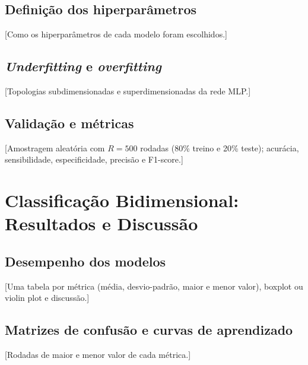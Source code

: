 \documentclass[conference]{IEEEtran}
\newcommand{\pendente}[1]{{\color{red}[#1]}}
\begin{document}
\subsection{Definição dos hiperparâmetros}
\pendente{Como os hiperparâmetros de cada modelo foram escolhidos.}

\subsection{\textit{Underfitting} e \textit{overfitting}}
\pendente{Topologias subdimensionadas e superdimensionadas da rede MLP.}

\subsection{Validação e métricas}
\pendente{Amostragem aleatória com $R = 500$ rodadas (80\% treino e 20\%
teste); acurácia, sensibilidade, especificidade, precisão e F1-score.}

\section{Classificação Bidimensional: Resultados e Discussão}\label{sec:res1}

\subsection{Desempenho dos modelos}
\pendente{Uma tabela por métrica (média, desvio-padrão, maior e menor
valor), boxplot ou violin plot e discussão.}


\subsection{Matrizes de confusão e curvas de aprendizado}
\pendente{Rodadas de maior e menor valor de cada métrica.}
\end{document}
